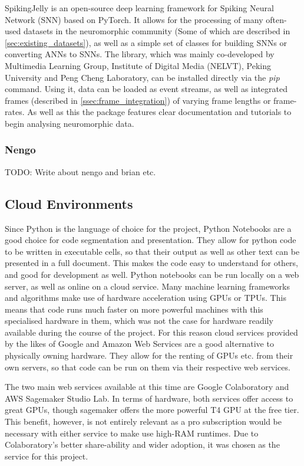 SpikingJelly\cite{SpikingJelly} is an open-source deep learning framework for Spiking Neural Network (SNN) based on PyTorch. It allows for the processing of many often-used datasets in the neuromorphic community (Some of which are described in \cref{sec:existing_datasets}), as well as a simple set of classes for building SNNs or converting ANNs to SNNs. The library, which was mainly co-developed by Multimedia Learning Group, Institute of Digital Media (NELVT), Peking University and Peng Cheng Laboratory, can be installed directly via the \emph{pip} command. Using it, data can be loaded as event streams, as well as integrated frames (described in \cref{ssec:frame_integration}) of varying frame lengths or frame-rates. As well as this the package features clear documentation and tutorials to begin analysing neuromorphic data.

\subsubsection{Nengo} \label{sssec:nengo}

\color{red} TODO: Write about nengo and brian etc. \color{black}

\subsection{Cloud Environments}

Since Python is the language of choice for the project, Python Notebooks are a good choice for code segmentation and presentation. They allow for python code to be written in executable cells, so that their output as well as other text can be presented in a full document. This makes the code easy to understand for others, and good for development as well. Python notebooks can be run locally on a web server, as well as online on a cloud service. Many machine learning frameworks and algorithms make use of hardware acceleration using GPUs or TPUs. This means that code runs much faster on more powerful machines with this specialised hardware in them, which was not the case for hardware readily available during the course of the project. For this reason cloud services provided by the likes of Google and Amazon Web Services are a good alternative to physically owning hardware. They allow for the renting of GPUs etc. from their own servers, so that code can be run on them via their respective web services. 

The two main web services available at this time are Google Colaboratory\cite{GoogleColab} and AWS Sagemaker Studio Lab\cite{AwsSagemaker}. In terms of hardware, both services offer access to great GPUs, though sagemaker offers the more powerful T4 GPU at the free tier. This benefit, however, is not entirely relevant as a pro subscription would be necessary with either service to make use high-RAM runtimes. Due to Colaboratory's better share-ability and wider adoption, it was chosen as the service for this project.

